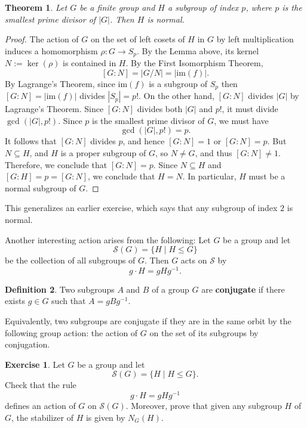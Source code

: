 \documentclass[12pt]{report}
\newtheorem{theorem}{Theorem}[chapter]
\numberwithin{equation}{section}
\numberwithin{theorem}{chapter}
\theoremstyle{definition}
\newtheorem{definition}[theorem]{Definition}
\newtheorem{exercise}{Exercise}
\newtheorem*{basic properties}{Basic Properties}
\newtheorem*{Important Remark}{Important Remark}
\renewcommand{\ker}{\operatorname{ker}}
\begin{document}
\begin{theorem}
	 Let $G$ be a finite group and $H$ a subgroup of index $p$, where $p$ is the smallest prime divisor of $|G|$. Then $H$ is normal.
\end{theorem}


\begin{proof} 
The action of $G$ on the set of left cosets of $H$ in $G$ by left multiplication induces a homomorphism $\rho\!: G \to S_p$. By the Lemma above, its kernel $N := \ker(\rho)$ is contained in $H$. By the First Isomorphism Theorem,
$$[G:N] = |G/N| = |\mathrm{im}(f)|.$$
By Lagrange's Theorem, since $\mathrm{im}(f)$ is a subgroup of $S_p$ then $[G:N] = |\mathrm{im}(f)|$ divides $|S_p|=p!$.
On the other hand, $[G:N]$ divides $|G|$ by Lagrange's Theorem. Since $[G:N]$ divides both $|G|$ and $p!$, it must divide $\gcd(|G|,p!)$. Since $p$ is the smallest prime divisor of $G$, we must have 
$$\gcd(|G|, p!) = p.$$ 
It follows that $[G:N]$ divides $p$, and hence $[G:N] =1$ or $[G:N] = p$. 
But $N \subseteq H$, and $H$ is a proper subgroup of $G$, so $N \neq G$, and thus $[G:N] \neq 1$. Therefore, we conclude that $[G:N] = p$. 
Since $N \subseteq H$ and $[G:H] = p = [G : N]$, we conclude that $H = N$. In particular, $H$ must be a normal subgroup of $G$.
\end{proof}


This generalizes an earlier exercise, which says that any subgroup of index $2$ is normal.



Another interesting action arises from the following:
Let $G$ be a group and let
$$\mathcal{S}(G) = \{H \mid H \leq G \}$$ 
be the collection of all subgroups of $G$. Then $G$ acts on $\mathcal{S}$ by 
$$g \cdot H = gHg^{-1}.$$


\begin{definition}
	Two subgroups $A$ and $B$ of a group $G$ are {\bf conjugate} if there exists $g \in G$ such that $A = gBg^{-1}$.
\end{definition}


Equivalently, two subgroups are conjugate if they are in the same orbit by the following group action: the action of $G$ on the set of its subgroups by conjugation.

\begin{exercise}\label{stabilizer of H by conjugation is N(G)}
Let $G$ be a group and let
$$\mathcal{S}(G) = \{H \mid H \leq G \}.$$ 
	Check that the rule
	$$g \cdot H = gHg^{-1}$$
	defines an action of $G$ on $\mathcal{S}(G)$. Moreover, prove that given any subgroup $H$ of $G$, the stabilizer of $H$ is given by $N_G(H)$.
\end{exercise}
\end{document}
